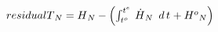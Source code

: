 \documentclass[border=2pt]{standalone}
\begin{document}
${{residualT}}{_{N}}={H}{_{N}}  - \left(\int_{ {{t^o}}{_{}} }^{ {{t^e}}{_{}} } \, {{\dot{H}}}{_{N}} \enskip d\,{t}{_{}}  + {{H^o}}{_{N}}\right)$
\end{document}
